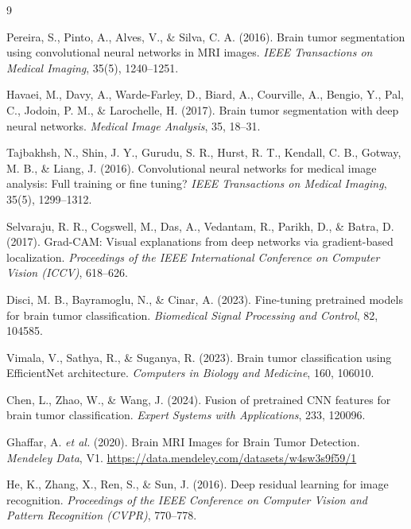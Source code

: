 \documentclass[twocolumn]{article}
\begin{document}
\begin{thebibliography}{9}

Pereira, S., Pinto, A., Alves, V., \& Silva, C. A. (2016).
Brain tumor segmentation using convolutional neural networks in MRI images.
\textit{IEEE Transactions on Medical Imaging}, 35(5), 1240--1251.

Havaei, M., Davy, A., Warde-Farley, D., Biard, A., Courville, A., Bengio, Y., Pal, C., Jodoin, P. M., \& Larochelle, H. (2017).
Brain tumor segmentation with deep neural networks.
\textit{Medical Image Analysis}, 35, 18--31.

Tajbakhsh, N., Shin, J. Y., Gurudu, S. R., Hurst, R. T., Kendall, C. B., Gotway, M. B., \& Liang, J. (2016).
Convolutional neural networks for medical image analysis: Full training or fine tuning?
\textit{IEEE Transactions on Medical Imaging}, 35(5), 1299--1312.

Selvaraju, R. R., Cogswell, M., Das, A., Vedantam, R., Parikh, D., \& Batra, D. (2017).
Grad-CAM: Visual explanations from deep networks via gradient-based localization.
\textit{Proceedings of the IEEE International Conference on Computer Vision (ICCV)}, 618--626.

Disci, M. B., Bayramoglu, N., \& Cinar, A. (2023).
Fine-tuning pretrained models for brain tumor classification.
\textit{Biomedical Signal Processing and Control}, 82, 104585.

Vimala, V., Sathya, R., \& Suganya, R. (2023).
Brain tumor classification using EfficientNet architecture.
\textit{Computers in Biology and Medicine}, 160, 106010.

Chen, L., Zhao, W., \& Wang, J. (2024).
Fusion of pretrained CNN features for brain tumor classification.
\textit{Expert Systems with Applications}, 233, 120096.

Ghaffar, A. \textit{et al.} (2020).
Brain MRI Images for Brain Tumor Detection.
\textit{Mendeley Data}, V1. \url{https://data.mendeley.com/datasets/w4sw3s9f59/1}

He, K., Zhang, X., Ren, S., \& Sun, J. (2016).
Deep residual learning for image recognition.
\textit{Proceedings of the IEEE Conference on Computer Vision and Pattern Recognition (CVPR)}, 770--778.

\end{thebibliography}
\end{document}

